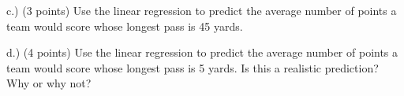 \documentclass[11pt]{article}
\begin{document}
\begin{questions}
c.) (3 points)   Use the linear regression to predict the average number of points a team would score whose longest pass is 45 yards.
\vspace{1in}


d.) (4 points) Use the linear regression to predict the average number of points a team would score whose longest pass is 5 yards.  Is this a realistic prediction?  Why or why not?
\vspace{1in}





\mbox{}
\end{questions}
\end{document}
